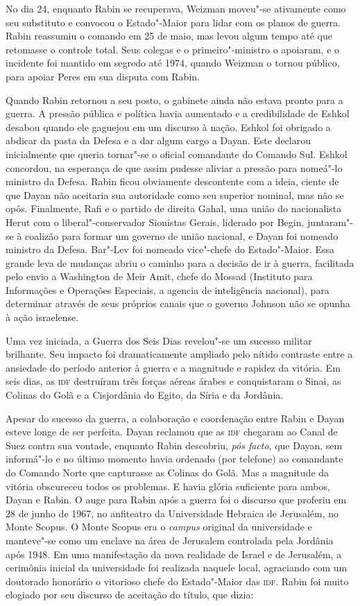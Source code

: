 No dia 24, enquanto Rabin se recuperava, Weizman moveu"-se ativamente
como seu substituto e convocou o Estado"-Maior para lidar com os planos
de guerra. Rabin reassumiu o comando em 25 de maio, mas levou algum
tempo até que retomasse o controle total. Seus colegas e o primeiro"-ministro
o apoiaram, e o incidente foi mantido em segredo até 1974,
quando Weizman o tornou público, para apoiar Peres em sua disputa com
Rabin.

Quando Rabin retornou a seu posto, o gabinete ainda não estava pronto
para a guerra. A pressão pública e política havia aumentado e a
credibilidade de Eshkol desabou quando ele gaguejou em um discurso à nação.
Eshkol foi obrigado a abdicar da pasta da Defesa e a dar algum cargo a
Dayan. Este declarou inicialmente que queria tornar"-se o oficial
comandante do Comando Sul. Eshkol concordou, na esperança de que assim
pudesse aliviar a pressão para nomeá"-lo ministro da Defesa. Rabin ficou
obviamente descontente com a ideia, ciente de que Dayan não aceitaria
sua autoridade como seu superior nominal, mas não se opôs. Finalmente,
Rafi e o partido de direita Gahal, uma união do nacionalista Herut com o
liberal"-conservador Sionistas Gerais, liderado por Begin, juntaram"-se à
coalizão para formar um governo de união nacional, e Dayan foi nomeado
ministro da Defesa. Bar"-Lev foi nomeado vice"-chefe do Estado"-Maior. Essa
grande leva de mudanças abriu o caminho para a decisão de ir à guerra,
facilitada pelo envio a Washington de Meir Amit, chefe do Mossad (Instituto para Informações e Operações Especiais, a
agencia de inteligência nacional), para determinar através de seus
próprios canais que o governo Johnson não se opunha à ação israelense.

Uma vez iniciada, a Guerra dos Seis Dias revelou"-se um sucesso militar
brilhante. Seu impacto foi dramaticamente ampliado pelo nítido contraste
entre a ansiedade do período anterior à guerra e a magnitude e rapidez
da vitória. Em seis dias, as \textsc{idf} destruíram três forças aéreas árabes e
conquistaram o Sinai, as Colinas do Golã e a Cisjordânia do Egito, da
Síria e da Jordânia.

Apesar do sucesso da guerra, a colaboração e coordenação entre Rabin e
Dayan esteve longe de ser perfeita. Dayan reclamou que as \textsc{idf} chegaram
ao Canal de Suez contra sua vontade, enquanto Rabin descobriu, \textit{pós
facto}, que Dayan, sem informá"-lo e no último momento havia ordenado
(por telefone) ao comandante do Comando Norte que capturasse as Colinas
do Golã. Mas a magnitude da vitória obscureceu todos os problemas. E
havia glória suficiente para ambos, Dayan e Rabin. O auge para Rabin
após a guerra foi o discurso que proferiu em 28 de junho de 1967, no
anfiteatro da Universidade Hebraica de Jerusalém, no Monte Scopus. O
Monte Scopus era o \textit{campus} original da universidade e manteve"-se como um
enclave na área de Jerusalem controlada pela Jordânia após 1948. Em uma
manifestação da nova realidade de Israel e de Jerusalém, a cerimônia
inicial da universidade foi realizada naquele local, agraciando com um
doutorado honorário o vitorioso chefe do Estado"-Maior das \textsc{idf}. Rabin foi
muito elogiado por seu discurso de aceitação do título, que dizia:

